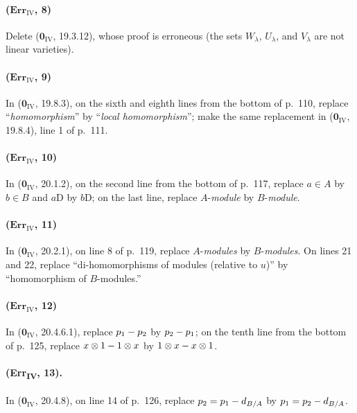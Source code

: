 \paragraph{($\mathbf{Err}_{\mathrm{IV}}$, 8)}
Delete ($\mathbf{0}_{\mathrm{IV}}$, 19.3.12), whose proof is erroneous (the sets
$W_\lambda$, $U_\lambda$, and $V_\lambda$ are not linear varieties).

\paragraph{($\mathbf{Err}_{\mathrm{IV}}$, 9)}
In ($\mathbf{0}_{\mathrm{IV}}$, 19.8.3), on the sixth and eighth lines from the
bottom of p.~110, replace ``\emph{homomorphism}'' by ``\emph{local homomorphism}'';
make the same replacement in ($\mathbf{0}_{\mathrm{IV}}$, 19.8.4), line 1 of
p.~111.

\paragraph{($\mathbf{Err}_{\mathrm{IV}}$, 10)}
In ($\mathbf{0}_{\mathrm{IV}}$, 20.1.2), on the second line from the bottom of
p.~117, replace $a\in A$ by $b\in B$ and $a\mathrm{D}$ by $b\mathrm{D}$; on the last line,
replace $A$-\emph{module} by $B$-\emph{module}.

\paragraph{($\mathbf{Err}_{\mathrm{IV}}$, 11)}
In ($\mathbf{0}_{\mathrm{IV}}$, 20.2.1), on line 8 of p.~119, replace
$A$-\emph{modules} by $B$-\emph{modules}.  On lines 21 and 22, replace
``di-homomorphisms of modules (relative to $u$)'' by ``homomorphism of
$B$-modules.''

\paragraph{($\mathbf{Err}_{\mathrm{IV}}$, 12)}
In ($\mathbf{0}_{\mathrm{IV}}$, 20.4.6.1), replace $p_1- p_2$ by $p_2- p_1$; on
the tenth line from the bottom of p.~125, replace
$x\otimes1- 1\otimes x$ by $1\otimes x- x\otimes1$.

\paragraph{(Err\textsubscript{IV}, 13).}
In ($\mathbf{0}_{\mathrm{IV}}$, 20.4.8), on line 14 of p.~126, replace
$p_2=p_1- d_{B/A}$ by $p_1=p_2- d_{B/A}$.


